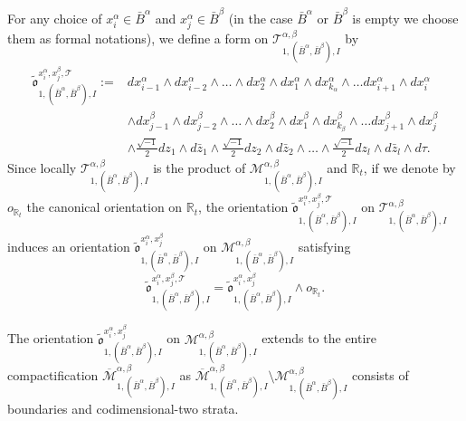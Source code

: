 \documentclass[11pt,a4paper]{article}
\theoremstyle{definition}
\theoremstyle{remark}
\numberwithin{equation}{section}
\def\Mbar{{\overline{\mathcal M}}}
\begin{document}
For any choice of $x^\alpha_i\in \bar B^\alpha$ and $x^\alpha_j\in \bar B^\beta$ (in the case $\bar B^\alpha$ or $\bar B^\beta$ is empty we choose them as formal notations), we define a form on $\mathcal T^{\alpha,\beta}_{1,(\bar{B}^\alpha,\bar{B}^\beta),I}$ by
\begin{equation}\label{eq definition orientaion moduli genus one before quotient}
\begin{split}
    \tilde{\mathfrak o}^{x^\alpha_i,x^\beta_j,\mathcal T}_{1,(\bar{B}^\alpha,\bar{B}^\beta),I}:=& dx^\alpha_{i-1}\wedge dx^\alpha_{i-2}\wedge\dots\wedge dx^\alpha_{2}\wedge dx^\alpha_{1} \wedge dx^\alpha_{k_\alpha} \wedge\dots dx^\alpha_{i+1}\wedge dx^\alpha_{i}\\
    &\wedge dx^\beta_{j-1}\wedge dx^\beta_{j-2}\wedge\dots\wedge dx^\beta_{2}\wedge dx^\beta_{1} \wedge dx^\beta_{k_\beta} \wedge\dots dx^\beta_{j+1}\wedge dx^\beta_{j}\\
    &\wedge \frac{\sqrt{-1}}{2}dz_1\wedge d\bar{z}_1\wedge  \frac{\sqrt{-1}}{2}dz_2\wedge d\bar{z}_2\wedge \dots \wedge \frac{\sqrt{-1}}{2}dz_l\wedge d\bar{z}_l \wedge d\tau.
\end{split}
    \end{equation}
Since locally $\mathcal T^{\alpha,\beta}_{1,(\bar{B}^\alpha,\bar{B}^\beta),I}$ is the product of $\mathcal M^{\alpha,\beta}_{1,(\bar{B}^\alpha,\bar{B}^\beta),I}$ and $\mathbb R_t$, if we denote by $o_{\mathbb R_t}$ the canonical orientation on $\mathbb R_t$, the orientation $\tilde{\mathfrak o}^{x^\alpha_i,x^\beta_j,\mathcal T}_{1,(\bar{B}^\alpha,\bar{B}^\beta),I}$ on $\mathcal T^{\alpha,\beta}_{1,(\bar{B}^\alpha,\bar{B}^\beta),I}$ induces an orientation $\tilde{\mathfrak o}^{x^\alpha_i,x^\beta_j}_{1,(\bar{B}^\alpha,\bar{B}^\beta),I}$ on $\mathcal M^{\alpha,\beta}_{1,(\bar{B}^\alpha,\bar{B}^\beta),I}$ satisfying
$$\tilde{\mathfrak o}^{x^\alpha_i,x^\beta_j,\mathcal T}_{1,(\bar{B}^\alpha,\bar{B}^\beta),I}=\tilde{\mathfrak o}^{x^\alpha_i,x^\beta_j}_{1,(\bar{B}^\alpha,\bar{B}^\beta),I}\wedge o_{\mathbb R_t}.$$

The orientation $\tilde{\mathfrak o}^{x^\alpha_i,x^\beta_j}_{1,(\bar{B}^\alpha,\bar{B}^\beta),I}$ on $\mathcal M^{\alpha,\beta}_{1,(\bar{B}^\alpha,\bar{B}^\beta),I}$ extends to the entire compactification $\Mbar^{\alpha,\beta}_{1,(\bar{B}^\alpha,\bar{B}^\beta),I}$ as $\Mbar^{\alpha,\beta}_{1,(\bar{B}^\alpha,\bar{B}^\beta),I}\setminus \mathcal M^{\alpha,\beta}_{1,(\bar{B}^\alpha,\bar{B}^\beta),I}$ consists of boundaries and codimensional-two strata.
\end{document}
